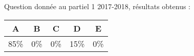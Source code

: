 \begin{exercice}[Partiel 2017-18]
Question donnée au partiel 1 2017-2018, résultats obtenus :

\begin{tabular}{|c|c|c|c|c|}
\hline
A & B & C & D & E \\ \hline
85\% & 0\% & 0\% & 15\% & 0\% \\ \hline
\end{tabular} 


\end{exercice}